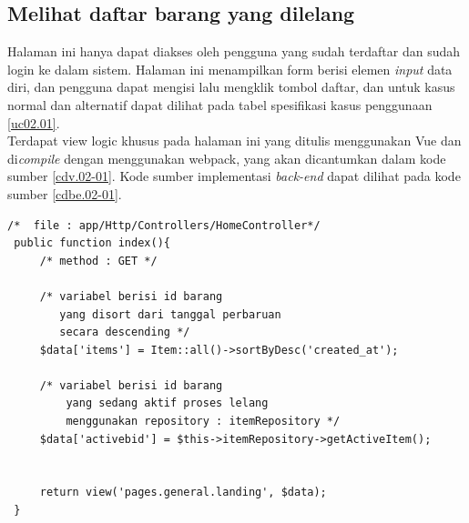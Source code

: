 \subsection{Melihat daftar barang yang dilelang}
Halaman ini hanya dapat diakses oleh pengguna yang sudah terdaftar dan sudah login ke dalam sistem. Halaman ini menampilkan form berisi elemen \textit{input} data diri, dan pengguna dapat mengisi lalu mengklik tombol daftar, dan untuk kasus normal dan alternatif dapat dilihat pada tabel spesifikasi kasus penggunaan \ref{uc02.01}.\\
\indent Terdapat view logic khusus pada halaman ini yang ditulis menggunakan Vue dan di\textit{compile} dengan menggunakan webpack, yang akan dicantumkan dalam kode sumber \ref{cdv.02-01}. Kode sumber implementasi \textit{back-end} dapat dilihat pada kode sumber \ref{cdbe.02-01}.

\begin{lstlisting}[label=cdbe.02-01,style=php,caption=Kode Sumber \textit{Back-end} Melihat Daftar Barang]
/*	file : app/Http/Controllers/HomeController*/
 public function index(){
	 /*	method : GET */
	 
	 /*	variabel berisi id barang 
		yang disort dari tanggal perbaruan
		secara descending */
	 $data['items'] = Item::all()->sortByDesc('created_at');
	 
	 /*	variabel berisi id barang 
		 yang sedang aktif proses lelang
		 menggunakan repository : itemRepository */
	 $data['activebid'] = $this->itemRepository->getActiveItem();
	 

	 return view('pages.general.landing', $data);
 }
\end{lstlisting}

